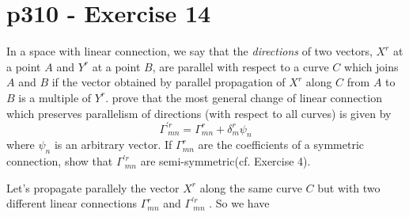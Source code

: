 \section{p310 - Exercise 14}
\begin{tcolorbox}
In a space with linear connection, we say that the \textit{directions} of two vectors, $X^r$ at a point $A$ and $Y^r$ at a point $B$, are parallel with respect to a curve $C$ which joins $A$ and $B$ if the vector obtained by parallel propagation of $X^r$ along $C$ from $A$ to $B$ is a multiple of $Y^r$. prove that the most general change of linear connection which preserves parallelism of directions (with respect to all curves) is given by 
$$\Gamma^{'r}_{\ mn} = \Gamma^r_{mn} + \delta^r_m \psi_n$$
where $\psi_n$ is an arbitrary vector. If $\Gamma^r_{mn}$ are the coefficients of a symmetric connection, show that $\Gamma^{'r}_{\ mn}$ are semi-symmetric(cf. Exercise 4).
\end{tcolorbox}
Let's propagate parallely the vector $X^r$ along the same curve $C$ but with two different linear connections $\Gamma^r_{mn}$ and $\Gamma^{'r}_{\ mn}$ . 
So we have

